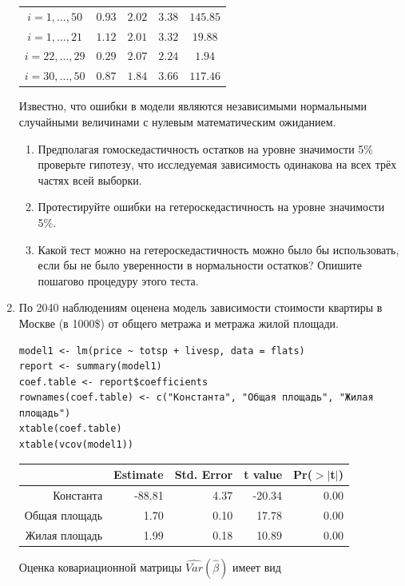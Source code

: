 \documentclass[12pt, a4paper]{article}
\begin{document}
\begin{enumerate}
\begin{tabular}{c|cccc}
\hline
$i=1,\ldots, 50$ & $0.93$ & $2.02$ & $3.38$ & $145.85$ \\
$i=1,\ldots, 21$ & $1.12$ & $2.01$ & $3.32$ & $19.88$ \\
$i=22,\ldots, 29$ & $0.29$ & $2.07$ & $2.24$ & $1.94$ \\
$i=30,\ldots, 50$ & $0.87$ & $1.84$ & $3.66$ & $117.46$ \\
\end{tabular}

Известно, что ошибки в модели являются независимыми нормальными случайными величинами с нулевым математическим ожиданием.

\begin{enumerate}
\item Предполагая гомоскедастичность остатков на уровне значимости 5\% проверьте гипотезу, что исследуемая зависимость одинакова на всех трёх частях всей выборки.
\item Протестируйте ошибки на гетероскедастичность на уровне значимости 5\%.
\item Какой тест можно на гетероскедастичность можно было бы использовать, если бы не было уверенности в нормальности остатков? Опишите пошагово процедуру этого теста.
\end{enumerate}


\item По 2040 наблюдениям оценена модель зависимости стоимости квартиры в Москве (в 1000\$) от общего метража и метража жилой площади.
\begin{verbatim}
model1 <- lm(price ~ totsp + livesp, data = flats)
report <- summary(model1)
coef.table <- report$coefficients
rownames(coef.table) <- c("Константа", "Общая площадь", "Жилая площадь")
xtable(coef.table)
xtable(vcov(model1))
\end{verbatim}

\begin{tabular}{rrrrr}
  \hline
 & Estimate & Std. Error & t value & Pr($>$$|$t$|$) \\
  \hline
Константа & -88.81 & 4.37 & -20.34 & 0.00 \\
  Общая площадь & 1.70 & 0.10 & 17.78 & 0.00 \\
  Жилая площадь & 1.99 & 0.18 & 10.89 & 0.00 \\
   \hline
\end{tabular}


Оценка ковариационной матрицы $\widehat{Var}(\hat{\beta})$ имеет вид



\end{enumerate}
\end{document}
